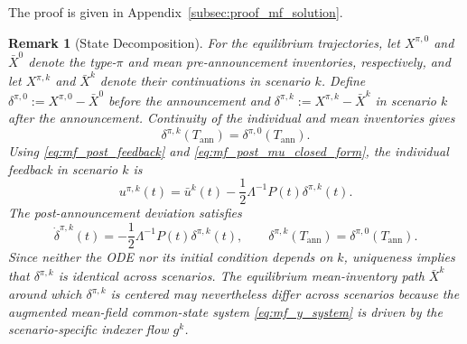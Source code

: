 \documentclass[12pt]{article}
\numberwithin{equation}{section}
\newtheorem{remark}[theorem]{Remark}
\theoremstyle{definition}
\begin{document}
The proof is given in Appendix~\ref{subsec:proof_mf_solution}.

\begin{remark}[State Decomposition]
\label{rem:mf_deviation_policy}
For the equilibrium trajectories, let \(X^{\pi,0}\) and \(\bar X^0\)
denote the type-\(\pi\) and mean pre-announcement inventories, respectively,
and let \(X^{\pi,k}\) and \(\bar X^k\) denote their continuations in
scenario \(k\). Define
\(\delta^{\pi,0}:=X^{\pi,0}-\bar X^0\) before the announcement and
\(\delta^{\pi,k}:=X^{\pi,k}-\bar X^k\) in scenario \(k\) after the
announcement. Continuity of the individual and mean inventories gives
\[
\delta^{\pi,k}(T_{\mathrm{ann}})
=\delta^{\pi,0}(T_{\mathrm{ann}}).
\]
Using \eqref{eq:mf_post_feedback} and
\eqref{eq:mf_post_mu_closed_form}, the individual feedback in scenario \(k\)
is
\begin{equation}\label{eq:mf_post_feedback_decomposition}
u^{\pi,k}(t)
=
\bar u^k(t)-\frac12\Lambda^{-1}P(t)\delta^{\pi,k}(t).
\end{equation}
The post-announcement deviation satisfies
\begin{equation}\label{eq:mf_post_deviation_dynamics}
\dot\delta^{\pi,k}(t)
=
-\frac12\Lambda^{-1}P(t)\delta^{\pi,k}(t),
\qquad
\delta^{\pi,k}(T_{\mathrm{ann}})
=\delta^{\pi,0}(T_{\mathrm{ann}}).
\end{equation}
Since neither the ODE nor its initial condition depends on \(k\), uniqueness
implies that \(\delta^{\pi,k}\) is identical across scenarios. The equilibrium
mean-inventory path \(\bar X^k\) around which \(\delta^{\pi,k}\) is centered
may nevertheless differ across scenarios because the augmented mean-field
common-state system
\eqref{eq:mf_y_system} is driven by the scenario-specific indexer flow \(g^k\).


\end{remark}
\end{document}
